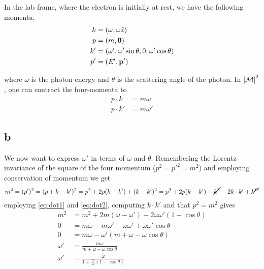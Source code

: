 \documentclass[11pt, a4paper]{amsart}
\begin{document}
In the lab frame, where the electron is initially at rest, we have the following momenta:
\begin{align}
k  &= (\omega, \omega\hat{z}) \\
p  &= (m, \vb{0}) \\
k' &= (\omega', \omega' \sin \theta, 0, \omega' \cos \theta) \\
p' &= (E', \vb{p}')
\end{align}

where $\omega$ is the photon energy and $\theta$ is the scattering angle of the photon. In $\abs{\mathcal{M}}^2$, one can contract the four-momenta to
\begin{align}
p \cdot k \   &= m \omega \label{eq:dot1}\\
p \cdot k' &= m \omega' \label{eq:dot2}
\end{align}

\subsection{b}
We now want to express $\omega'$ in terms of $\omega$ and $\theta$. Remembering the Lorentz invariance of the square of the four momentum ($p^2 = p'^2 = m^2$) and employing conservation of momentum we get
\begin{equation}
m^2 = (p')^2 = (p + k - k')^2 = p^2 + 2p(k-k') + (k -k')^2 = p^2 + 2p(k-k') + \cancel{k^2} - 2k\cdot k' + \cancel{k'^2}
\end{equation}
employing \autoref{eq:dot1} and \autoref{eq:dot2}, computing $k\cdot k'$ and that $p^2 = m^2$ gives
\begin{align}
  m^2 &= m^2 + 2m(\omega - \omega') - 2\omega\omega'(1 - \cos \theta) \nonumber \\
       0 &= m\omega -m\omega' - \omega\omega' + \omega\omega'\cos \theta \nonumber \\
       0 &=m\omega - \omega'(m + \omega - \omega\cos\theta) \nonumber \\
       \omega' &= \frac{m\omega}{m + \omega - \omega\cos\theta} \nonumber \\
       \omega' &= \frac{\omega}{1 + \frac{m}{\omega}(1-\cos\theta)}
\end{align}
\end{document}
